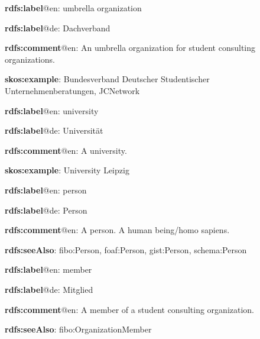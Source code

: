 \documentclass[a4paper, DIV=13, BCOR=0cm]{scrbook}
\begin{document}
\begin{mdframed}[style=onto-2, frametitle={Umbrella\_Organization}]
	{%
		\begin{compactitem}
			\item \textbf{rdfs:label}@en: umbrella organization
			\item \textbf{rdfs:label}@de: Dachverband
			\item \textbf{rdfs:comment}@en: An umbrella organization for student consulting organizations.
			\item \textbf{skos:example}: Bundesverband Deutscher Studentischer Unternehmenberatungen, JCNetwork
		\end{compactitem}
	} %
\end{mdframed}

\begin{mdframed}[style=onto-2, frametitle={University}]
	{%
		\begin{compactitem}
			\item \textbf{rdfs:label}@en: university
			\item \textbf{rdfs:label}@de: Universität
			\item \textbf{rdfs:comment}@en: A university.
			\item \textbf{skos:example}: University Leipzig
		\end{compactitem}
	} %
\end{mdframed}

\begin{mdframed}[style=onto-1, frametitle={Person}]
	{%
		\begin{compactitem}
			\item \textbf{rdfs:label}@en: person
			\item \textbf{rdfs:label}@de: Person
			\item \textbf{rdfs:comment}@en: A person. A human being/homo sapiens.
			\item \textbf{rdfs:seeAlso}: fibo:Person, foaf:Person, gist:Person, schema:Person
		\end{compactitem}
	} %
\end{mdframed}

\begin{mdframed}[style=onto-2, frametitle={Member}]
	{%
		\begin{compactitem}
			\item \textbf{rdfs:label}@en: member
			\item \textbf{rdfs:label}@de: Mitglied
			\item \textbf{rdfs:comment}@en: A member of a student consulting organization.
			\item \textbf{rdfs:seeAlso}: fibo:OrganizationMember
		\end{compactitem}
	} %
\end{mdframed}
\end{document}
